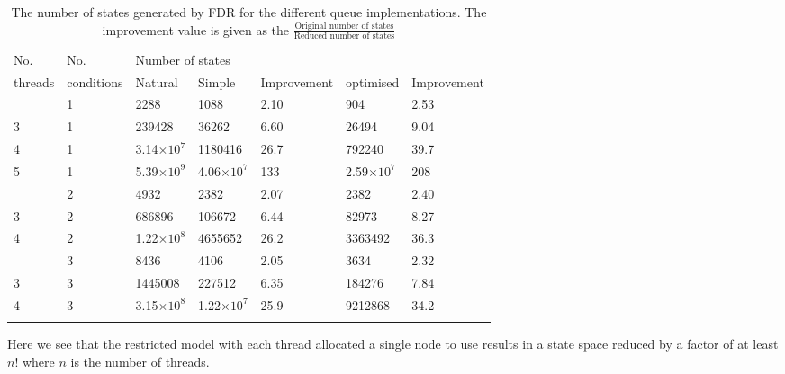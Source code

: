 \begin{table}
  \renewcommand*{\arraystretch}{1.2}
  \caption{The number of states generated by FDR for the different queue implementations. The improvement value is given as the $\frac{\text{Original number of states}}{\text{Reduced number of states}}$}
    \begin{tabularx}{\linewidth}{|l|l|X|X|X|X|X|}
      \thickhline
      No.&No.& \multicolumn{5}{l|}{Number of states} \\
      threads&conditions& Natural & Simple & Improvement & optimised & Improvement\\
      \thickhline
      2 & 1 & 2288 & 1088 & 2.10& 904 & 2.53\\ \hline
      3 & 1 & 239428 & 36262 & 6.60& 26494 & 9.04 \\ \hline
      4 & 1 & 3.14$\times\text{10}^\text{7}$ & 1180416 & 26.7& 792240 & 39.7\\ \hline
      5 & 1 & 5.39$\times\text{10}^\text{9}$ & 4.06$\times\text{10}^\text{7}$ & 133& 2.59$\times\text{10}^\text{7}$ &208 \\
      \thickhline
      2 & 2 & 4932 & 2382 & 2.07& 2382 & 2.40\\ \hline
      3 & 2 & 686896 & 106672 & 6.44& 82973 & 8.27\\ \hline
      4 & 2 & 1.22$\times\text{10}^\text{8}$ & 4655652 & 26.2& 3363492 & 36.3\\ 
      \thickhline
      2 & 3 & 8436 & 4106 & 2.05& 3634 & 2.32\\ \hline
      3 & 3 & 1445008 & 227512 & 6.35 & 184276 & 7.84\\ \hline
      4 & 3 & 3.15$\times\text{10}^\text{8}$ & 1.22$\times\text{10}^\text{7}$ & 25.9& 9212868 & 34.2\\ 
      \thickhline
    \end{tabularx}
    \label{table::queue}
  \end{table}

  Here we see that the restricted model with each thread allocated a single node to use results in a state space reduced by a factor of at least $n!$ where $n$ is the number of threads. 
  
  
  

